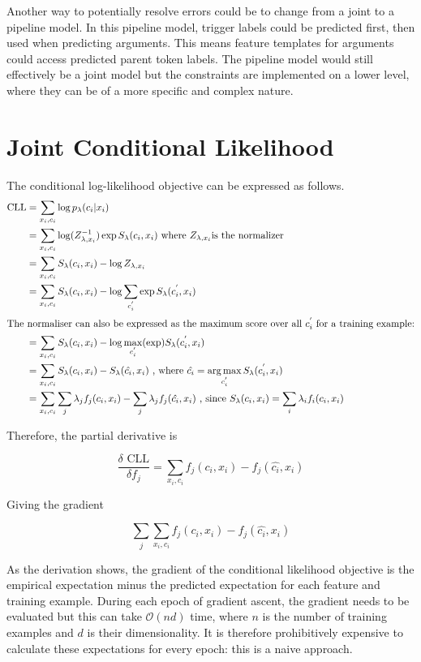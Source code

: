 \documentclass{article} %
\DeclareMathOperator*{\argmax}{arg\,max}
\begin{document}
Another way to potentially resolve errors could be to change from a joint to a pipeline model. In this pipeline model, trigger labels could be predicted first, then used when predicting arguments. This means feature templates for arguments could access predicted parent token labels. The pipeline model would still effectively be a joint model but the constraints are implemented on a lower level, where they can be of a more specific and complex nature.

\section{Joint Conditional Likelihood}

The conditional log-likelihood objective can be expressed as follows.
\begin{align*} 
	\text{CLL}&=\sum_{x_i, c_i} \log p_{\lambda}(c_i | x_i)\\
	&=\sum_{x_i, c_i} \log (Z^{-1}_{\lambda, x_i}) \exp S_{\lambda} (c_i, x_i) \text{ where } Z_{\lambda, x_i} \text{is the normalizer}\\
	&=\sum_{x_i, c_i} S_{\lambda} (c_i, x_i) - \log Z_{\lambda, x_i}\\
	&=\sum_{x_i, c_i} S_{\lambda} (c_i, x_i) - \log \sum_{c^{'}_i} \exp S_{\lambda} (c^{'}_i, x_i)\\
	\intertext{The normaliser can also be expressed as the maximum score over all $c^{'}_i$ for a training example:}
	&=\sum_{x_i, c_i} S_{\lambda} (c_i, x_i) - \log \max_{c^{'}_i} (\exp ) S_{\lambda} (c^{'}_i, x_i)\\
	&=\sum_{x_i, c_i} S_{\lambda} (c_i, x_i) - S_{\lambda} (\hat{c_i}, x_i) \text{ , where }   \hat{c_i} = \argmax_{c^{'}_i}  S_{\lambda} (c^{'}_i, x_i)\\
	&=\sum_{x_i, c_i} \sum_j \lambda_j f_j (c_i, x_i) - \sum_j \lambda_j f_j (\hat{c_i}, x_i)  \text{ , since } S_{\lambda} (c_i, x_i) = \sum_i \lambda_i f_i (c_i, x_i)
\end{align*}

Therefore, the partial derivative is

\[ \frac{\delta \text{ CLL}}{\delta f_j} = \sum_{x_i, c_i} f_j (c_i, x_i) - f_j (\hat{c_i}, x_i)        \]

Giving the gradient

\[ \sum_j \sum_{x_i, c_i} f_j (c_i, x_i) - f_j (\hat{c_i}, x_i)        \]

As the derivation shows, the gradient of the conditional likelihood objective is the empirical expectation minus the predicted expectation for each feature and training example. During each epoch of gradient ascent, the gradient needs to be evaluated but this can take $\mathcal{O}(nd)$ time, where $n$ is the number of training examples and $d$ is their dimensionality. It is therefore prohibitively expensive to calculate these expectations for every epoch: this is a naive approach.
\end{document}
